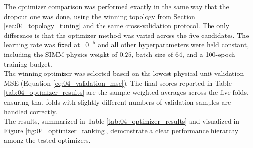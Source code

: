 The optimizer comparison was performed exactly in the same way that the dropout one was done, using the winning topology from Section \ref{sec:04_topology_tuning} and the same cross-validation protocol. The only difference is that the optimizer method was varied across the five candidates. The learning rate was fixed at $10^{-5}$ and all other hyperparameters were held constant, including the SIMM physics weight of $0.25$, batch size of 64, and a 100-epoch training budget.\\

The winning optimizer was selected based on the lowest physical-unit validation MSE (Equation \eqref{eq:04_validation_mse}). The final scores reported in Table \ref{tab:04_optimizer_results} are the sample-weighted averages across the five folds, ensuring that folds with slightly different numbers of validation samples are handled correctly.\\

The results, summarized in Table \ref{tab:04_optimizer_results} and visualized in Figure \ref{fig:04_optimizer_ranking}, demonstrate a clear performance hierarchy among the tested optimizers.

